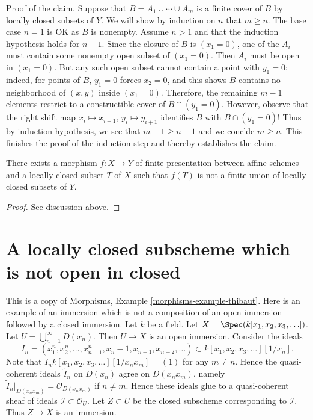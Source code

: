 \medskip\noindent
Proof of the claim. Suppose that $B = A_1 \cup \cdots \cup A_m$
is a finite cover of $B$ by locally closed subsets of $Y$.
We will show by induction on $n$ that $m \geq n$. The base
case $n = 1$ is OK as $B$ is nonempty. Assume $n > 1$ and that
the induction hypothesis holds for $n - 1$. Since the closure of $B$ is
$(x_1 = 0)$, one of the $A_i$ must contain some nonempty open subset of
$(x_1 = 0)$. Then $A_i$ must be open in $(x_1 = 0)$.
But any such open subset cannot contain a point with
$y_1 = 0$; indeed, for points of $B$, $y_1 = 0$ forces $x_2 = 0$,
and this shows $B$ contains no neighborhood of $(x, y)$ inside $(x_1 = 0)$.
Therefore, the remaining $m - 1$ elements restrict
to a constructible cover of $B \cap (y_1 = 0)$.
However, observe that the right shift map
$x_i \mapsto x_{i + 1}$, $y_i \mapsto y_{i + 1}$ identifies $B$
with $B \cap (y_1 = 0)$! Thus by induction hypothesis, we see that
$m - 1 \geq n - 1$ and we conclde $m \geq n$. This finishes
the proof of the induction step and thereby establishes the claim.

\begin{lemma}
\label{lemma-no-chevalley}
There exists a morphism $f : X \to Y$ of finite presentation
between affine schemes and a locally closed subset $T$ of $X$
such that $f(T)$ is not a finite union of locally closed subsets of $Y$.
\end{lemma}

\begin{proof}
See discussion above.
\end{proof}










\section{A locally closed subscheme which is not open in closed}
\label{section-strange-immersion}

\noindent
This is a copy of
Morphisms, Example \ref{morphisms-example-thibaut}.
Here is an example of an immersion which is not a composition of an
open immersion followed by a closed immersion.
Let $k$ be a field.
Let $X = \Spec(k[x_1, x_2, x_3, \ldots])$.
Let $U = \bigcup_{n = 1}^{\infty} D(x_n)$.
Then $U \to X$ is an open immersion.
Consider the ideals
$$
I_n =
(x_1^n, x_2^n, \ldots, x_{n - 1}^n, x_n - 1, x_{n + 1}, x_{n + 2}, \ldots)
\subset
k[x_1, x_2, x_3, \ldots][1/x_n].
$$
Note that $I_n k[x_1, x_2, x_3, \ldots][1/x_nx_m] = (1)$
for any $m \not = n$. Hence the quasi-coherent ideals
$\widetilde I_n$ on $D(x_n)$ agree on $D(x_nx_m)$, namely
$\widetilde I_n|_{D(x_nx_m)} = \mathcal{O}_{D(x_n x_m)}$ if
$n \not = m$. Hence these ideals glue to a quasi-coherent sheaf of ideals
$\mathcal{I} \subset \mathcal{O}_U$.
Let $Z \subset U$ be the closed subscheme corresponding to
$\mathcal{I}$. Thus $Z \to X$ is an immersion.

